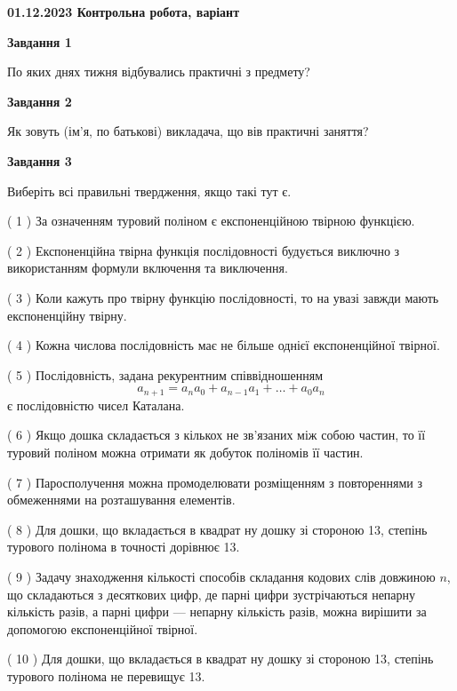 \documentclass[12pt, ukrainian]{article}
\begin{document}
\begin {large}

\textbf{01.12.2023 Контрольна робота, варіант  }\par


{
{\begin {center}\textbf{Завдання 1}\end {center}}\par
По яких днях тижня відбувались практичні з предмету?\par
{\begin {center}\textbf{Завдання 2}\end {center}}\par
Як зовуть (ім'я, по батькові) викладача, що вів практичні заняття?\par
{\begin {center}\textbf{Завдання 3}\end {center}}\par
Виберіть всі правильні твердження, якщо такі тут є.\par
\vspace{2mm}
( 1 ) За означенням туровий поліном є експоненційною твірною функцією.%

( 2 ) Експоненційна твірна функція послідовності будується виключно з використанням формули включення та виключення.%

( 3 ) Коли кажуть про твірну функцію послідовності, то на увазі завжди мають експоненційну твірну.%

( 4 ) Кожна числова послідовність має не більше однієї  експоненційної твірної.%

( 5 ) Послідовність, задана рекурентним співвідношенням $$a_{n+1}=a_{n}a_{0}+a_{n-1}a_{1}+\ldots+a_0a_{n}$$ є послідовністю чисел Каталана.%

( 6 ) Якщо дошка складається з кількох не зв’язаних між собою частин, то її туровий поліном можна отримати як добуток поліномів її частин.%

( 7 ) Паросполучення можна промоделювати розміщенням з повтореннями з обмеженнями на розташування елементів.%

( 8 ) Для дошки, що вкладається в квадрат ну дошку зі стороною 13, степінь турового полінома в точності дорівнює 13.%

( 9 ) Задачу знаходження кількості способів складання кодових слів довжиною $n$, що складаються з десяткових цифр, де парні цифри зустрічаються непарну кількість разів, а парні цифри — непарну кількість разів, можна вирішити за допомогою експоненційної твірної.%

( 10 ) Для дошки, що вкладається в квадрат ну дошку зі стороною 13, степінь турового полінома не перевищує 13.%
}
\end {large}

\vspace{4mm}
\newpage
\end{document}
